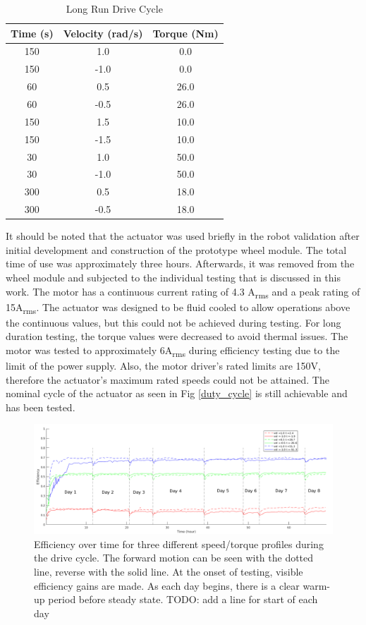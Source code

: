 \begin{table}[h]
\caption{Long Run Drive Cycle}
\label{table_2}
\begin{center}
\begin{tabular}{|c||c||c|}
\hline
Time (s) & Velocity (rad/s) & Torque (Nm)\\
\hline
150 & 1.0 & 0.0\\
\hline
150 & -1.0 & 0.0\\
\hline
60 & 0.5 & 26.0\\
\hline
60 & -0.5 & 26.0\\
\hline
150 & 1.5 & 10.0\\
\hline
150 & -1.5 & 10.0\\
\hline
30 & 1.0 & 50.0\\
\hline
30 & -1.0 & 50.0\\
\hline
300 & 0.5 & 18.0\\
\hline
300 & -0.5 & 18.0\\
\hline
\end{tabular}
\end{center}
\end{table}
It should be noted that the actuator was used briefly in the robot validation after initial development and construction of the prototype wheel module. The total time of use was approximately three hours. Afterwards, it was removed from the wheel module and subjected to the individual testing that is discussed in this work. The motor has a continuous current rating of 4.3 A\textsubscript{rms} and a peak rating of 15A\textsubscript{rms}. The actuator was designed to be fluid cooled to allow operations above the continuous values, but this could not be achieved during testing. For long duration testing, the torque values were decreased to avoid thermal issues. The motor was tested to approximately 6A\textsubscript{rms} during efficiency testing due to the limit of the power supply. Also, the motor driver's rated limits are 150V, therefore the actuator's maximum rated speeds could not be attained. The nominal cycle of the actuator as seen in Fig \ref{duty_cycle} is still achievable and has been tested. 
      
   \begin{figure}[t]
      \centering
      \includegraphics[width=\linewidth]{long_run_plot_v3}
      \caption{Efficiency over time for three different speed/torque profiles during the drive cycle. The forward motion can be seen with the dotted line, reverse with the solid line. At the onset of testing, visible efficiency gains are made. As each day begins, there is a clear warm-up period before steady state. TODO: add a line for start of each day}
      \label{long_run}
   \end{figure}
   
   